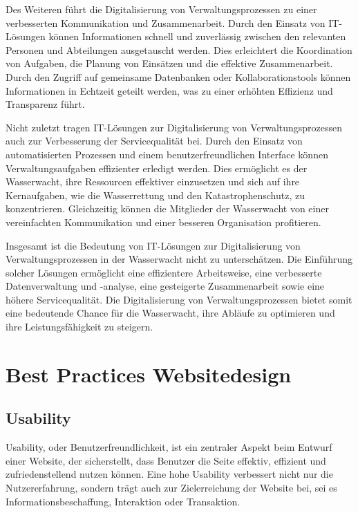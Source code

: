 \documentclass[fontsize=12pt,openright,oneside,paper=a4,BCOR=1cm]{scrbook}
\begin{document}
Des Weiteren führt die Digitalisierung von Verwaltungsprozessen zu einer verbesserten Kommunikation und Zusammenarbeit. Durch den Einsatz von IT-Lösungen können Informationen schnell und zuverlässig zwischen den relevanten Personen und Abteilungen ausgetauscht werden. Dies erleichtert die Koordination von Aufgaben, die Planung von Einsätzen und die effektive Zusammenarbeit. Durch den Zugriff auf gemeinsame Datenbanken oder Kollaborationstools können Informationen in Echtzeit geteilt werden, was zu einer erhöhten Effizienz und Transparenz führt.

Nicht zuletzt tragen IT-Lösungen zur Digitalisierung von Verwaltungsprozessen auch zur Verbesserung der Servicequalität bei. Durch den Einsatz von automatisierten Prozessen und einem benutzerfreundlichen Interface können Verwaltungsaufgaben effizienter erledigt werden. Dies ermöglicht es der Wasserwacht, ihre Ressourcen effektiver einzusetzen und sich auf ihre Kernaufgaben, wie die Wasserrettung und den Katastrophenschutz, zu konzentrieren. Gleichzeitig können die Mitglieder der Wasserwacht von einer vereinfachten Kommunikation und einer besseren Organisation profitieren.

Insgesamt ist die Bedeutung von IT-Lösungen zur Digitalisierung von Verwaltungsprozessen in der Wasserwacht nicht zu unterschätzen. Die Einführung solcher Lösungen ermöglicht eine effizientere Arbeitsweise, eine verbesserte Datenverwaltung und -analyse, eine gesteigerte Zusammenarbeit sowie eine höhere Servicequalität. Die Digitalisierung von Verwaltungsprozessen bietet somit eine bedeutende Chance für die Wasserwacht, ihre Abläufe zu optimieren und ihre Leistungsfähigkeit zu steigern.

\section{Best Practices Websitedesign}

\subsection{Usability}
Usability, oder Benutzerfreundlichkeit, ist ein zentraler Aspekt beim Entwurf einer Website, der sicherstellt, dass Benutzer die Seite effektiv, effizient und zufriedenstellend nutzen können. Eine hohe Usability verbessert nicht nur die Nutzererfahrung, sondern trägt auch zur Zielerreichung der Website bei, sei es Informationsbeschaffung, Interaktion oder Transaktion.
\end{document}
